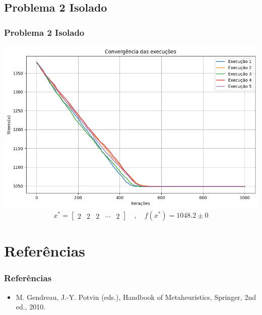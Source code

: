 \documentclass{beamer}
\begin{document}
    \subsection{Problema 2 Isolado}
    \begin{frame}
        \frametitle{Problema 2 Isolado}

        \centering
        \includegraphics[width=\textwidth,trim=1 1 1 1,clip]{images/convergencia_execucoes.png}
        \[  x^* = \begin{bmatrix} 2 & 2 & 2 & \cdots & 2 \end{bmatrix} \quad , \quad f\left(x^*\right) = 1048.2 \pm 0 \]
    \end{frame}


\section{Referências}

    \begin{frame}
        \frametitle{Referências}

        \begin{itemize}
            \item M. Gendreau, J.-Y. Potvin (eds.), Handbook of Metaheuristics, Springer, 2nd ed.,
            2010.
        \end{itemize}
    \end{frame}
\end{document}
